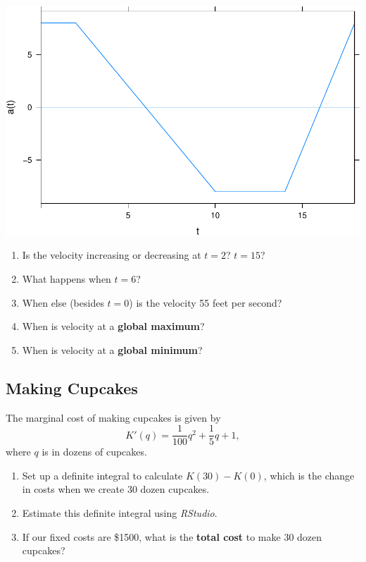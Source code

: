 \documentclass[
]{book}
\providecommand{\tightlist}{%
  \setlength{\itemsep}{0pt}\setlength{\parskip}{0pt}}
\begin{document}
\begin{center}\includegraphics{_bookdown_files/math135_handbook_files/figure-latex/unnamed-chunk-134-1} \end{center}

\begin{enumerate}
\def\labelenumi{\arabic{enumi}.}
\tightlist
\item
  Is the velocity increasing or decreasing at \(t=2\)? \(t=15\)?
\item
  What happens when \(t=6\)?
\item
  When else (besides \(t=0\)) is the velocity 55 feet per second?
\item
  When is velocity at a \textbf{global maximum}?
\item
  When is velocity at a \textbf{global minimum}?
\end{enumerate}

\hypertarget{making-cupcakes}{%
\subsection{Making Cupcakes}\label{making-cupcakes}}

The marginal cost of making cupcakes is given by \[K'(q)=\frac{1}{100}q^2+\frac{1}{5}q+1,\]
where \(q\) is in dozens of cupcakes.

\begin{enumerate}
\def\labelenumi{\arabic{enumi}.}
\tightlist
\item
  Set up a definite integral to calculate \(K(30)-K(0)\), which is the change in costs when we create 30 dozen cupcakes.
\item
  Estimate this definite integral using \emph{RStudio}.
\item
  If our fixed costs are \$1500, what is the \textbf{total cost} to make 30 dozen cupcakes?
\end{enumerate}
\end{document}
